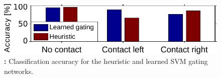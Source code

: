 


	\begin{figure}[t]
			\centering
			\includegraphics[width=.5\hsize]{robertoICRA/fig/exp5_accuracy_red}
		\caption{\textbf{:} Classification accuracy for the heuristic and learned SVM gating networks.
		}
		\label{fig:exp5:accuracy}
        \figspace
	\end{figure}
